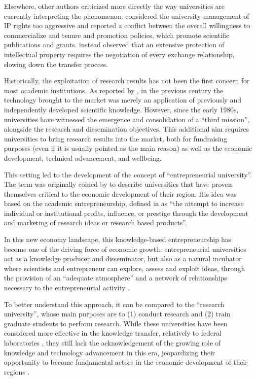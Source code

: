 Elsewhere, other authors criticized more directly the way universities are currently interpreting the phenomenon. \citet{Siegel2003a} considered the university management of IP rights too aggressive and reported a conflict between the overall willingness to commercialize and tenure and promotion policies, which promote scientific publications and grants. \citet{Murray2005} instead observed that an extensive protection of intellectual property requires the negotiation of every exchange relationship, slowing down the transfer process.

Historically, the exploitation of research results has not been the first concern for most academic institutions. As reported by \citet{Balconi2006}, in the previous century the technology brought to the market was merely an application of previously and independently developed scientific knowledge. However, since the early 1980s, universities have witnessed the emergence and consolidation of a \enquote{third mission}, alongside the research and dissemination objectives. This additional aim requires universities to bring research results into the market, both for fundraising purposes (even if it is usually pointed as the main reason) as well as the economic development, technical advancement, and wellbeing. 

This setting led to the development of the concept of \enquote{entrepreneurial university}. The term was originally coined by \citet{Etzkowitz1998} to describe universities that have proven themselves critical to the economic development of their region. His idea was based on the academic entrepreneurship, defined in \citet{Louis1989} as \enquote{the attempt to increase individual or institutional profits, influence, or prestige through the development and marketing of research ideas or research based products}.

In this new economy landscape, this knowledge-based entrepreneurship has become one of the driving force of economic growth: entrepreneurial universities act as a knowledge producer and disseminator, but also as a natural incubator where scientists and entrepreneur can explore, assess and exploit ideas, through the provision of an \enquote{adequate atmosphere} and a network of relationships necessary to the entrepreneurial activity \citep{Guerrero2014}.

To better understand this approach, it can be compared to the \enquote{research university}, whose main purposes are to (1) conduct research and (2) train graduate students to perform research. While these universities have been considered more effective in the knowledge transfer, relatively to federal laboratories \citep{Rogers2001}, they still lack the acknowledgement of the growing role of knowledge and technology advancement in this era, jeopardizing their opportunity to become fundamental actors in the economic development of their regions \citep{OShea2004}.

